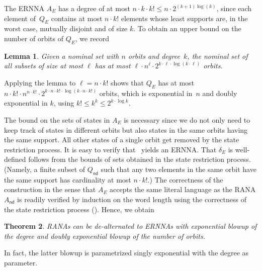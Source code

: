 \documentclass[10pt,a4paper]{amsart}
\newtheorem{theo}{Theorem}[section]
\newtheorem{lem}[theo]{Lemma}
\theoremstyle{definition}
\newcommand{\op}[1]{\operatorname{\mathsf{#1}}}
\newcommand{\nd}{\op{nd}}
\begin{document}
\noindent The ERNNA $A_E$ has a degree of at most $n \cdot k \cdot k! \leqslant
n \cdot 2^{(k + 1)\log(k)}$, since each element of~$Q_E$ contains at
most $n \cdot k!$ elements whose least supports are, in the worst
case, mutually disjoint and of size $k$.
To obtain an upper bound on the number of orbits of $Q_E$, we record %
\begin{lem}\label{L:Bell}
  Given a nominal set with $n$ orbits and degree~$k$, the nominal set of all subsets of size at most $\ell$ has at most $\ell \cdot n^\ell \cdot 2^{k\cdot \ell \cdot \log(k \cdot\ell)}$ orbits.
\end{lem}

Applying the lemma to $\ell = n \cdot k!$ shows that $Q_E$ has at most
$
  n \cdot k! \cdot  n^{n \cdot k!} \cdot 2^{k \cdot n \cdot k! \cdot\log(k \cdot n \cdot k!)}$ orbits, which is exponential in~$n$ and doubly exponential in $k$, using $k! \leqslant k^k \leqslant 2^{k\cdot \log k}$.

  The bound on the sets of states in $A_E$ is necessary since we do not only need to keep track
  of states in different orbits but also states in the same orbits having the same support.
  All other states of a single orbit get removed by the state restriction process.  It is easy
  to verify that~ yields an ERNNA.  That $\delta_E$ is well-defined follows
  from the bounds of sets obtained in the state restriction process.  (Namely, a finite subset
  of $Q_{\nd}$ such that any two elements in the same orbit have the same support has
  cardinality at most $n\cdot k!$.)  The correctness of the construction in the sense that
  $A_E$ accepts the same literal language as the RANA $A_{\nd}$ is readily verified by
  induction on the word length using the correctness of the state restriction process
  (). Hence, we obtain


\begin{theo}\label{thm:corrdealt}
  RANAs can be de-alternated to ERNNAs with exponential blowup of the degree
  and doubly exponential blowup of the number of orbits.
\end{theo}

\noindent In fact, the latter blowup is parametrized singly exponential with the
degree as parameter.
\end{document}
